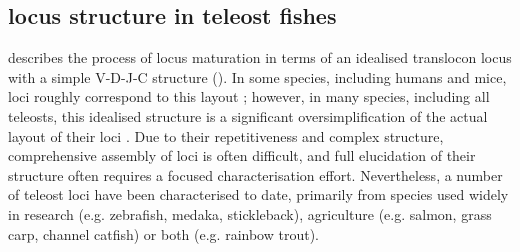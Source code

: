 \begin{figure}
\label{fig:intro-vdjr}
\end{figure}

\subsection{\igh{} locus structure in teleost fishes}
\label{sec:intro_teleost_loci}

 describes the process of \igh{} locus maturation in terms of an idealised translocon locus with a simple V-D-J-C structure (). In some species, including humans and mice, \igh{} loci roughly correspond to this layout \parencite{jung2006vdjr}; however, in many species, including all teleosts, this idealised structure is a significant oversimplification of the actual layout of their \igh{} loci \parencite{fillatreau2013astonishing}. Due to their repetitiveness and complex structure, comprehensive assembly of \igh{} loci is often difficult, and full elucidation of their structure often requires a focused characterisation effort. Nevertheless, a number of teleost loci have been characterised to date, primarily from species used widely in research (e.g. zebrafish, medaka, stickleback), agriculture (e.g. salmon, grass carp, channel catfish) or both (e.g. rainbow trout).

